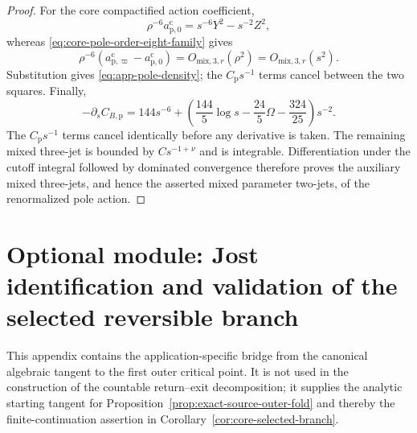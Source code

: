 \documentclass[11pt]{amsart}
\numberwithin{equation}{section}
\theoremstyle{definition}
\theoremstyle{remark}
\begin{document}
\begin{proof}
For the core compactified action coefficient,
\begin{equation}\label{eq:app-pole-action-scaling}
 \rho^{-6}a_{\mathrm p,0}^{\mathrm c}
 =s^{-6}Y^2-s^{-2}Z^2,
\end{equation}
whereas \eqref{eq:core-pole-order-eight-family} gives
\begin{equation}\label{eq:app-pole-action-perturbation}
 \rho^{-6}(a_{\mathrm p,\varpi}^{\mathrm c}
             -a_{\mathrm p,0}^{\mathrm c})
 =O_{\mathrm{mix},3,r}(\rho^2)
 =O_{\mathrm{mix},3,r}(s^2).
\end{equation}
Substitution gives \eqref{eq:app-pole-density}; the $C_{\mathrm p}s^{-1}$ terms
cancel between the two squares.  Finally,
\begin{equation}\label{eq:app-pole-counterterm-derivative}
 -\partial_sC_{B,\mathrm p}
 =144s^{-6}
 +\left(\frac{144}{5}\log s-\frac{24}{5}\Omega
       -\frac{324}{25}\right)s^{-2}.
\end{equation}
The $C_{\mathrm p}s^{-1}$ terms cancel identically before any derivative is
taken.  The remaining mixed three-jet is bounded by $Cs^{-1+\nu}$ and is
integrable.  Differentiation under the cutoff integral followed by
dominated convergence therefore proves the auxiliary mixed three-jets,
and hence the asserted mixed parameter two-jets, of the renormalized pole
action.
\end{proof}

\section{Optional module: Jost identification and validation of the selected reversible branch}
\label{app:jost-source-arm}

This appendix contains the application-specific bridge from the canonical
algebraic tangent to the first outer critical point.  It is not used in the
construction of the countable return--exit decomposition; it supplies the
analytic starting tangent for Proposition~\ref{prop:exact-source-outer-fold}
and thereby the finite-continuation assertion in
Corollary~\ref{cor:core-selected-branch}.
\end{document}
